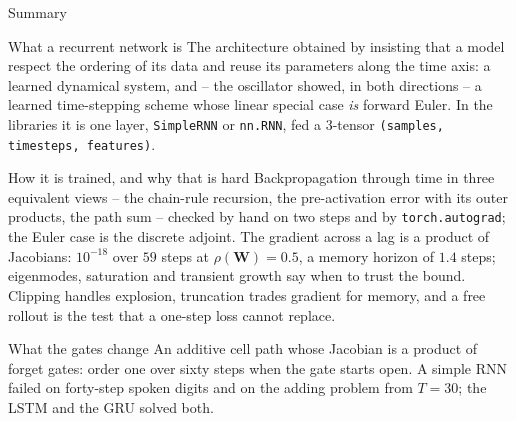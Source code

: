 \documentclass[10pt,aspectratio=169]{beamer}
\begin{document}
\begin{frame}{Summary}
\small
\begin{block}{What a recurrent network is}
The architecture obtained by insisting that a model respect the ordering of
its data and reuse its parameters along the time axis: a learned dynamical
system, and -- the oscillator showed, in both directions -- a learned
time-stepping scheme whose linear special case \emph{is} forward Euler.
In the libraries it is one layer, \texttt{SimpleRNN} or \texttt{nn.RNN},
fed a 3-tensor \texttt{(samples, timesteps, features)}.
\end{block}
\begin{block}{How it is trained, and why that is hard}
Backpropagation through time in three equivalent views -- the chain-rule
recursion, the pre-activation error with its outer products, the path sum
-- checked by hand on two steps and by \texttt{torch.autograd}; the Euler
case is the discrete adjoint.  The gradient across a lag is a product of
Jacobians: $10^{-18}$ over $59$ steps at $\rho(\bm{W})=0.5$, a memory
horizon of $1.4$ steps; eigenmodes, saturation and transient growth say when
to trust the bound.  Clipping handles explosion, truncation trades gradient
for memory, and a free rollout is the test that a one-step loss cannot
replace.
\end{block}
\begin{block}{What the gates change}
An additive cell path whose Jacobian is a product of forget gates: order one
over sixty steps when the gate starts open.  A simple RNN failed on
forty-step spoken digits and on the adding problem from $T=30$; the LSTM and
the GRU solved both.
\end{block}
\end{frame}
\end{document}
